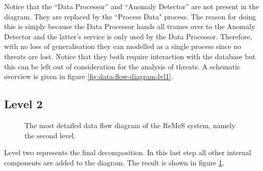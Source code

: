\npar Notice that the ``Data Processor'' and ``Anomaly Detector'' are not
present in the diagram. They are replaced by the ``Process Data" process. The
reason for doing this is simply because the Data Processor hands all trames over
to the Anomaly Detector and the latter's service is only used by the Data
Processor. Therefore, with no loss of generalisation they can modelled as a
single process since no threats are lost. Notice that they both require
interaction with the database but this can be left out of consideration for the
analysis of threats. A schematic overview is given in figure
\ref{fig:data-flow-diagram-lvl1}.

\subsection{Level 2}

\begin{figure}[H]
	\begin{centering}
		\caption{The most detailed data flow diagram of the ReMeS system, namely the
		second level.}
		\label{fig:data-flow-diagram-lvl2}
	\end{centering}
\end{figure}

\npar Level two represents the final decomposition. In this last step all
other internal components are added to the diagram. The result is shown in
figure \ref{fig:data-flow-diagram-lvl2}.
